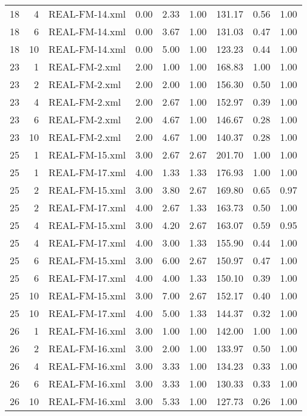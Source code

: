 \begin{table}[ht]
\begin{tabular}{rrlrrrrrr}
   18 &   4 & REAL-FM-14.xml & 0.00 & 2.33 & 1.00 & 131.17 & 0.56 & 1.00 \\ 
   18 &   6 & REAL-FM-14.xml & 0.00 & 3.67 & 1.00 & 131.03 & 0.47 & 1.00 \\ 
   18 &  10 & REAL-FM-14.xml & 0.00 & 5.00 & 1.00 & 123.23 & 0.44 & 1.00 \\ 
   23 &   1 & REAL-FM-2.xml & 2.00 & 1.00 & 1.00 & 168.83 & 1.00 & 1.00 \\ 
   23 &   2 & REAL-FM-2.xml & 2.00 & 2.00 & 1.00 & 156.30 & 0.50 & 1.00 \\ 
   23 &   4 & REAL-FM-2.xml & 2.00 & 2.67 & 1.00 & 152.97 & 0.39 & 1.00 \\ 
   23 &   6 & REAL-FM-2.xml & 2.00 & 4.67 & 1.00 & 146.67 & 0.28 & 1.00 \\ 
   23 &  10 & REAL-FM-2.xml & 2.00 & 4.67 & 1.00 & 140.37 & 0.28 & 1.00 \\ 
   25 &   1 & REAL-FM-15.xml & 3.00 & 2.67 & 2.67 & 201.70 & 1.00 & 1.00 \\ 
   25 &   1 & REAL-FM-17.xml & 4.00 & 1.33 & 1.33 & 176.93 & 1.00 & 1.00 \\ 
   25 &   2 & REAL-FM-15.xml & 3.00 & 3.80 & 2.67 & 169.80 & 0.65 & 0.97 \\ 
   25 &   2 & REAL-FM-17.xml & 4.00 & 2.67 & 1.33 & 163.73 & 0.50 & 1.00 \\ 
   25 &   4 & REAL-FM-15.xml & 3.00 & 4.20 & 2.67 & 163.07 & 0.59 & 0.95 \\ 
   25 &   4 & REAL-FM-17.xml & 4.00 & 3.00 & 1.33 & 155.90 & 0.44 & 1.00 \\ 
   25 &   6 & REAL-FM-15.xml & 3.00 & 6.00 & 2.67 & 150.97 & 0.47 & 1.00 \\ 
   25 &   6 & REAL-FM-17.xml & 4.00 & 4.00 & 1.33 & 150.10 & 0.39 & 1.00 \\ 
   25 &  10 & REAL-FM-15.xml & 3.00 & 7.00 & 2.67 & 152.17 & 0.40 & 1.00 \\ 
   25 &  10 & REAL-FM-17.xml & 4.00 & 5.00 & 1.33 & 144.37 & 0.32 & 1.00 \\ 
   26 &   1 & REAL-FM-16.xml & 3.00 & 1.00 & 1.00 & 142.00 & 1.00 & 1.00 \\ 
   26 &   2 & REAL-FM-16.xml & 3.00 & 2.00 & 1.00 & 133.97 & 0.50 & 1.00 \\ 
   26 &   4 & REAL-FM-16.xml & 3.00 & 3.33 & 1.00 & 134.23 & 0.33 & 1.00 \\ 
   26 &   6 & REAL-FM-16.xml & 3.00 & 3.33 & 1.00 & 130.33 & 0.33 & 1.00 \\ 
   26 &  10 & REAL-FM-16.xml & 3.00 & 5.33 & 1.00 & 127.73 & 0.26 & 1.00 \\ 

\end{tabular}
\end{table}

